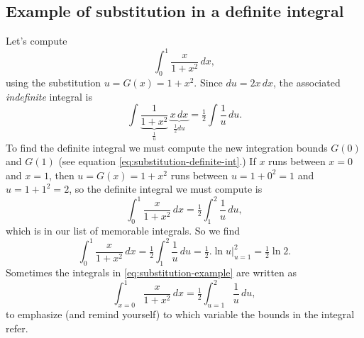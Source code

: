 \subsection{Example of substitution in a definite integral} %
Let's compute
\[
\int_0^1 \frac{x}{1+x^2}\,d x,
\]
using the substitution $u=G(x)=1+x^2$. Since $d u = 2x\,d x$, the
associated \emph{indefinite} integral is
\[
\int \underbrace{\frac{1}{1+x^2}}_{\frac1u} \, \underbrace{x\,d
  x}_{\tfrac12 d u} = \tfrac12\int \frac 1u \, d u.
\]
To find the definite integral we must compute the new integration bounds $G(0)$
and $G(1)$ (see equation \eqref{eq:substitution-definite-int}.) If $x$ runs
between $x=0$ and $x=1$, then $u=G(x)=1+x^2$ runs between $u=1+0^2=1$ and
$u=1+1^2=2$, so the definite integral we must compute is
\begin{equation}\label{eq:substitution-example}
  \int_0^1 \frac{x}{1+x^2}\,d x 
  = \tfrac12\int_1^2 \frac 1u \, d u,
\end{equation}
which is in our list of memorable integrals. So we find
\[
\int_0^1 \frac{x}{1+x^2}\,d x = \tfrac12\int_1^2 \frac 1u \, d u
=\tfrac12\bigl.\ln u\bigr|_{u=1}^2 = \tfrac12\ln 2.
\]
Sometimes the integrals in \eqref{eq:substitution-example} are written
as
\[
\int_{x=0}^1 \frac{x}{1+x^2}\,d x = \tfrac12\int_{u=1}^2 \frac 1u \, d
u,
\]
to emphasize (and remind yourself) to which variable the bounds in the
integral refer.


